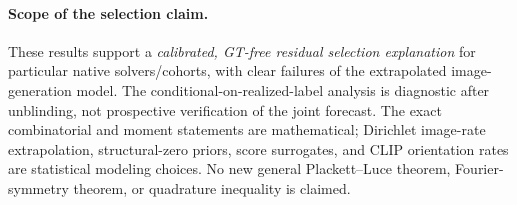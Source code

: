 \paragraph{Scope of the selection claim.}
These results support a \emph{calibrated, GT-free residual
selection explanation} for particular native solvers/cohorts,
with clear failures of the extrapolated image-generation model.
The conditional-on-realized-label analysis is diagnostic after
unblinding, not prospective verification of the joint forecast.
The exact combinatorial and moment statements are mathematical;
Dirichlet image-rate extrapolation, structural-zero priors,
score surrogates, and CLIP orientation rates are statistical
modeling choices. No new general Plackett--Luce theorem,
Fourier-symmetry theorem, or quadrature inequality is claimed.
